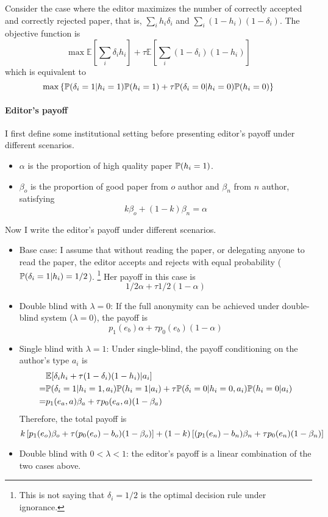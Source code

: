 \documentclass[12pt]{article}
\begin{document}
Consider the case where the editor maximizes the number of correctly accepted
and correctly rejected paper, that is, $\sum_i h_i\delta_i$ and $\sum_i
    (1-h_i)(1-\delta_i)$. The objective function is
\begin{equation}
    \max \mathbb{E}[\sum_i \delta_i h_i] + \tau \mathbb{E}[\sum_i (1-\delta_i)(1-h_i)]
\end{equation}
which is equivalent to
\[
    \max  \left\{ \mathbb{P}(\delta_i = 1|h_i = 1)\mathbb{P}(h_i = 1) +\tau \mathbb{P}(\delta_i = 0|h_i = 0)\mathbb{P}(h_i = 0)\right\}
\]
\paragraph{Editor's payoff}
I first define some institutional setting before presenting editor's payoff
under different scenarios.
\begin{itemize}
    \item $\alpha$ is the proportion of high quality paper $\mathbb{P}(h_i=1)$.
    \item $\beta_o$ is the proportion of good paper from $o$ author and $\beta_n$ from $n$ author, satisfying
          \[k\beta_o+(1-k)\beta_n=\alpha\]
\end{itemize}
Now I write the editor's payoff under different scenarios.
\begin{itemize}
    \item Base case: I assume that without reading the paper, or delegating anyone to
          read the paper, the editor accepts and rejects with equal probability
          ($\mathbb{P}(\delta_i=1|h_i)=1/2$). \footnote{This is not saying that $\delta_i=1/2$ is
              the optimal decision rule under ignorance.} Her payoff in this case is
          \[1/2 \alpha +\tau 1/2 (1-\alpha)\]

    \item Double blind with $\lambda=0$: If the full anonymity can be achieved under
          double-blind system ($\lambda=0$), the payoff is
          \[p_1(e_b)\alpha+\tau p_0(e_b)(1-\alpha)\]
    \item Single blind with $\lambda=1$: Under single-blind, the payoff conditioning on
          the author's type $a_i$ is
          \begin{equation*}
              \begin{split}
                    & \mathbb{E}[\delta_i h_i+\tau(1-\delta_i)(1-h_i)|a_i]                                    \\
                  = & \mathbb{P}(\delta_i=1|h_i=1,a_i)\mathbb{P}(h_i=1|a_i)+\tau\mathbb{P}(\delta_i=0|h_i=0,a_i)\mathbb{P}(h_i=0|a_i) \\
                  = & p_1(e_a,a)\beta_a+\tau p_0(e_a,a)(1-\beta_a)
              \end{split}
          \end{equation*}
          Therefore, the total payoff is
          \[k \left[p_1(e_o)\beta_o+\tau (p_0(e_o)-b_o)(1-\beta_o)\right]+(1-k)\left[(p_1(e_n)-b_n)\beta_n+\tau p_0(e_n)(1-\beta_n)\right]\]
    \item Double blind with $0<\lambda<1$: the editor's payoff is a linear combination of
          the two cases above.
\end{itemize}
\end{document}
